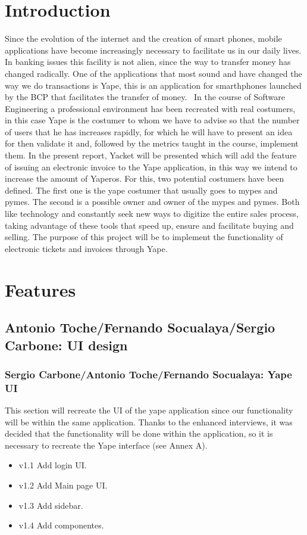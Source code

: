 \documentclass{article}
\begin{document}
\section{Introduction}
Since the evolution of the internet and the creation of smart phones, mobile applications have become increasingly necessary to facilitate us in our daily lives. In banking issues this facility is not alien, since the way to transfer money has changed radically. One of the applications that most sound and have changed the way we do transactions is Yape, this is an application for smarthphones launched by the BCP that facilitates the transfer of money.
 In the course of Software Engineering a professional environment has been recreated with real costumers, in this case Yape is the costumer to whom we have to advise so that the number of users that he has increases rapidly, for which he will have to present an idea for then validate it and, followed by the metrics taught in the course, implement them. In the present report, Yacket will be presented which will add the feature of issuing an electronic invoice to the Yape application, in this way we intend to increase the amount of Yaperos.
For this, two potential costumers have been defined. The first one is the yape costumer that usually goes to mypes and pymes. The second is a possible owner and owner of the mypes and pymes. Both like technology and constantly seek new ways to digitize the entire sales process, taking advantage of these tools that speed up, ensure and facilitate buying and selling.
The purpose of this project will be to implement the functionality of electronic tickets and invoices through Yape.

\section{Features}
 \subsection{Antonio Toche/Fernando Socualaya/Sergio Carbone: UI design}
 \blindtext
\subsubsection{Sergio Carbone/Antonio Toche/Fernando Socualaya: Yape UI}
This section will recreate the UI of the yape application since our functionality will be within the same application. Thanks to the enhanced interviews, it was decided that the functionality will be done within the application, so it is necessary to recreate the Yape interface (see Annex A).
\begin{itemize}
\item v1.1 Add login UI.
\item v1.2 Add Main page UI.
\item v1.3 Add sidebar.
\item v1.4 Add componentes.
\end{itemize}
\end{document}
